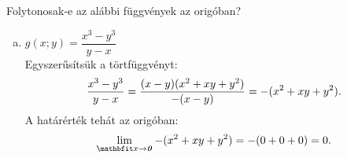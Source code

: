 \begin{exercise}{Folytonosak-e az alábbi függvények az origóban?}
{\begin{enumerate}[a)]
      \item $g(x; y) = \dfrac{x^3 - y^3}{{y - x}}$\\[2mm]
            Egyszerűsítsük a törtfüggvényt:
            \[
              \frac{x^3 - y^3}{y - x} =
              \frac{(x - y)(x^2 + xy + y^2)}{-(x - y)} =
              -(x^2 + xy + y^2)
              \text.
            \]
            A határérték tehát az origóban:
            \[
              \lim_{\rvec x \rightarrow \nvec} -(x^2 + xy + y^2)
              = -(0 + 0 + 0)
              = 0
              \text.
            \]
    \end{enumerate}
  }
\end{exercise}
